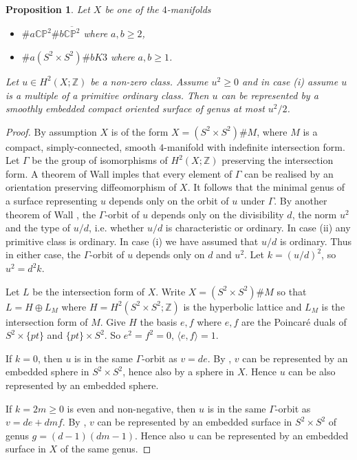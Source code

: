 \documentclass{amsart}
\newtheorem{proposition}[theorem]{Proposition}
\theoremstyle{definition}
\theoremstyle{remark}
\numberwithin{equation}{section}
\begin{document}
\begin{proposition}\label{prop:minred}
Let $X$ be one of the $4$-manifolds
\begin{itemize}
\item[(i)]{$\# a \mathbb{CP}^2 \# b \overline{\mathbb{CP}^2}$ where $a,b \ge 2$,}
\item[(ii)]{$\# a(S^2 \times S^2) \# b K3$ where $a,b \ge 1$.}
\end{itemize}
Let $u \in H^2(X ; \mathbb{Z})$ be a non-zero class. Assume $u^2 \ge 0$ and in case (i) assume $u$ is a multiple of a primitive ordinary class. Then $u$ can be represented by a smoothly embedded compact oriented surface of genus at most $u^2/2$.
\end{proposition}
\begin{proof}
By assumption $X$ is of the form $X = (S^2 \times S^2) \# M$, where $M$ is a compact, simply-connected, smooth $4$-manifold with indefinite intersection form. Let $\Gamma$ be the group of isomorphisms of $H^2(X ; \mathbb{Z})$ preserving the intersection form. A theorem of Wall \cite{wall} imples that every element of $\Gamma$ can be realised by an orientation preserving diffeomorphism of $X$. It follows that the minimal genus of a surface representing $u$ depends only on the orbit of $u$ under $\Gamma$. By another theorem of Wall \cite{wall0}, the $\Gamma$-orbit of $u$ depends only on the divisibility $d$, the norm $u^2$ and the type of $u/d$, i.e. whether $u/d$ is characteristic or ordinary. In case (ii) any primitive class is ordinary. In case (i) we have assumed that $u/d$ is ordinary. Thus in either case, the $\Gamma$-orbit of $u$ depends only on $d$ and $u^2$. Let $k = (u/d)^2$, so $u^2 = d^2k$.

Let $L$ be the intersection form of $X$. Write $X = (S^2 \times S^2) \# M$ so that $L = H \oplus L_M$ where $H = H^2(S^2 \times S^2 ; \mathbb{Z})$ is the hyperbolic lattice and $L_M$ is the intersection form of $M$. Give $H$ the basis $e,f$ where $e,f$ are the Poincar\'e duals of $S^2 \times \{ pt \}$ and $\{pt \} \times S^2$. So $e^2 = f^2 = 0$, $\langle e , f \rangle = 1$. 

If $k = 0$, then $u$ is in the same $\Gamma$-orbit as $v = de$. By \cite{rub}, $v$ can be represented by an embedded sphere in $S^2 \times S^2$, hence also by a sphere in $X$. Hence $u$ can be also represented by an embedded sphere.

If $k = 2m \ge 0$ is even and non-negative, then $u$ is in the same $\Gamma$-orbit as $v = de + dmf$. By \cite{rub}, $v$ can be represented by an embedded surface in $S^2 \times S^2$ of genus $g = (d-1)(dm-1)$. Hence also $u$ can be represented by an embedded surface in $X$ of the same genus.


\end{proof}
\end{document}
